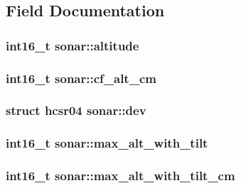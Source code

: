 \subsection{Field Documentation}
\hypertarget{structsonar_a29b0ab60089b976e07964c161032fa67}{
\subsubsection[{altitude}]{\setlength{\rightskip}{0pt plus 5cm}int16\+\_\+t sonar\+::altitude}}\label{structsonar_a29b0ab60089b976e07964c161032fa67}
\hypertarget{structsonar_a9f565d5614b9288a7624544b95a05f1f}{
\subsubsection[{cf\+\_\+alt\+\_\+cm}]{\setlength{\rightskip}{0pt plus 5cm}int16\+\_\+t sonar\+::cf\+\_\+alt\+\_\+cm}}\label{structsonar_a9f565d5614b9288a7624544b95a05f1f}
\hypertarget{structsonar_af002b13bfccde4c53f025847accd9f64}{
\subsubsection[{dev}]{\setlength{\rightskip}{0pt plus 5cm}struct {\bf hcsr04} sonar\+::dev}}\label{structsonar_af002b13bfccde4c53f025847accd9f64}
\hypertarget{structsonar_abdfba03b0fcd3a4e976e3fe298a08cbd}{
\subsubsection[{max\+\_\+alt\+\_\+with\+\_\+tilt}]{\setlength{\rightskip}{0pt plus 5cm}int16\+\_\+t sonar\+::max\+\_\+alt\+\_\+with\+\_\+tilt}}\label{structsonar_abdfba03b0fcd3a4e976e3fe298a08cbd}
\hypertarget{structsonar_aa03ed590552a2e4eedc16458336a9713}{
\subsubsection[{max\+\_\+alt\+\_\+with\+\_\+tilt\+\_\+cm}]{\setlength{\rightskip}{0pt plus 5cm}int16\+\_\+t sonar\+::max\+\_\+alt\+\_\+with\+\_\+tilt\+\_\+cm}}\label{structsonar_aa03ed590552a2e4eedc16458336a9713}
